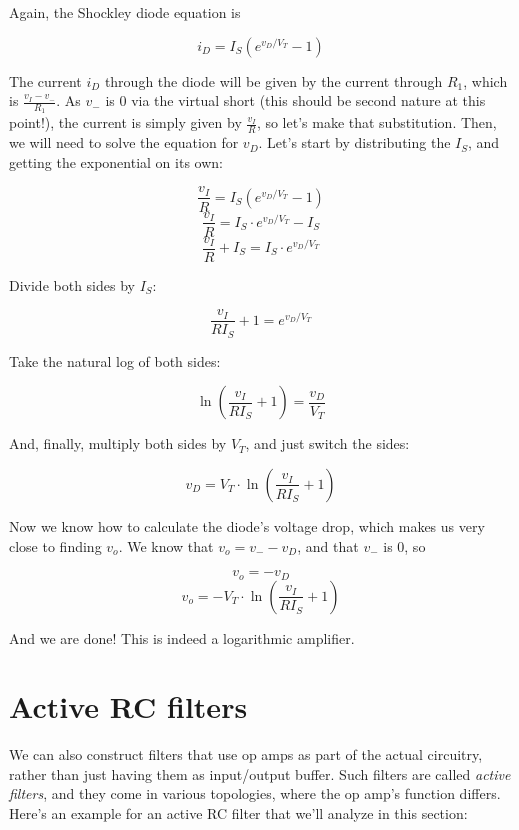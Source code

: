 \documentclass[12pt,a4paper]{report}
\begin{document}
Again, the Shockley diode equation is

\[ i_D = I_S(e^{v_D/V_T} - 1) \]

The current $i_D$ through the diode will be given by the current through $R_1$, which is $\displaystyle \frac{v_I - v_-}{R_1}$. As $v_-$ is 0 via the virtual short (this should be second nature at this point!), the current is simply given by $\displaystyle \frac{v_I}{R}$, so let's make that substitution. Then,
we will need to solve the equation for $v_D$. Let's start by distributing the $I_S$, and getting the exponential on its own:

\[ \frac{v_I}{R} = I_S(e^{v_D/V_T} - 1) \]
\[ \frac{v_I}{R} = I_S \cdot e^{v_D/V_T} - I_S \]
\[ \frac{v_I}{R} + I_S = I_S \cdot e^{v_D/V_T} \]

Divide both sides by $I_S$:

\[ \frac{v_I}{R I_S} + 1 = e^{v_D/V_T} \]

Take the natural log of both sides:

\[ \ln{(\frac{v_I}{R I_S} + 1)} = \frac{v_D}{V_T} \]

And, finally, multiply both sides by $V_T$, and just switch the sides:

\[ v_D = V_T \cdot \ln{(\frac{v_I}{R I_S} + 1)} \]

Now we know how to calculate the diode's voltage drop, which makes us very close to finding $v_o$. We know that $v_o = v_- - v_D$, and that $v_-$ is 0, so

\[ v_o = -v_D \]
\[ v_o = -V_T \cdot \ln{(\frac{v_I}{R I_S} + 1)} \]

And we are done! This is indeed a logarithmic amplifier.

\section{Active RC filters}
We can also construct filters that use op amps as part of the actual circuitry, rather than just having them as input/output buffer. Such filters are called \emph{active filters}, and they come in various topologies, where the op amp's function differs.\\
Here's an example for an active RC filter that we'll analyze in this section:\\
\end{document}
